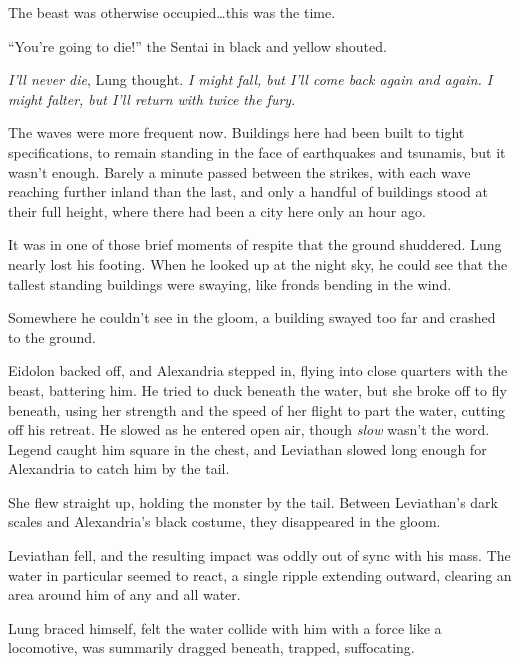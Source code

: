 The beast was otherwise occupied\ldots this was the time.



``You're going to die!'' the Sentai in black and yellow shouted.



\emph{I'll never die}, Lung thought.  \emph{I might fall, but I'll come back again and again.  I might falter, but I'll return with twice the fury}.



The waves were more frequent now.  Buildings here had been built to tight specifications, to remain standing in the face of earthquakes and tsunamis, but it wasn't enough.  Barely a minute passed between the strikes, with each wave reaching further inland than the last, and only a handful of buildings stood at their full height, where there had been a city here only an hour ago.



It was in one of those brief moments of respite that the ground shuddered.  Lung nearly lost his footing.  When he looked up at the night sky, he could see that the tallest standing buildings were swaying, like fronds bending in the wind.



Somewhere he couldn't see in the gloom, a building swayed too far and crashed to the ground.



Eidolon backed off, and Alexandria stepped in, flying into close quarters with the beast, battering him.  He tried to duck beneath the water, but she broke off to fly beneath, using her strength and the speed of her flight to part the water, cutting off his retreat.  He slowed as he entered open air, though \emph{slow} wasn't the word.  Legend caught him square in the chest, and Leviathan slowed long enough for Alexandria to catch him by the tail.



She flew straight up, holding the monster by the tail.  Between Leviathan's dark scales and Alexandria's black costume, they disappeared in the gloom.



Leviathan fell, and the resulting impact was oddly out of sync with his mass.  The water in particular seemed to react, a single ripple extending outward, clearing an area around him of any and all water.



Lung braced himself, felt the water collide with him with a force like a locomotive, was summarily dragged beneath, trapped, suffocating.



